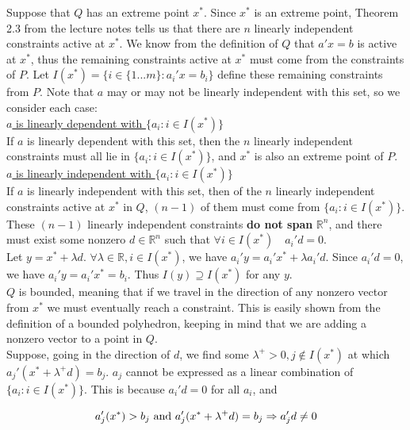 \documentclass[11pt]{article}
\begin{document}
Suppose that $Q$ has an extreme point $x^*$. Since $x^*$ is an extreme point, Theorem 2.3 from the lecture notes tells us that there are $n$ linearly independent constraints active at $x^*$. We know from the definition of $Q$ that $a'x=b$ is active at $x^*$, thus the remaining constraints active at $x^*$ must come from the constraints of $P$. Let $I(x^*)=\{i\in\{1...m\}:a_i'x=b_i\}$ define these remaining constraints from $P$. Note that $a$ may or may not be linearly independent with this set, so we consider each case:\\

\underline{$a$ is linearly dependent with $\{a_i:i\in I(x^*)\}$}\\

If $a$ is linearly dependent with this set, then the $n$ linearly independent constraints must all lie in $\{a_i:i\in I(x^*)\}$, and $x^*$ is also an extreme point of $P$.\\

\underline{$a$ is linearly independent with $\{a_i:i\in I(x^*)\}$}\\

If $a$ is linearly independent with this set, then of the $n$ linearly independent constraints active at $x^*$ in $Q$, $(n-1)$ of them must come from  $\{a_i:i\in I(x^*)\}$. These $(n-1)$ linearly independent constraints \textbf{do not span} $\mathbb{R}^n$, and there must exist some nonzero $d\in\mathbb{R}^n$ such that $\forall i\in I(x^*)\quad a_i'd=0$.\\

Let $y=x^*+\lambda d$. $\forall \lambda\in\mathbb{R}, i\in I(x^*)$, we have $a_i'y=a_i'x^*+\lambda a_i'd$. Since $a_i'd=0$, we have $a_i'y = a_i'x^*=b_i$. Thus $I(y)\supseteq I(x^*)$ for any $y$. \\

$Q$ is bounded, meaning that if we travel in the direction of any nonzero vector from $x^*$ we must eventually reach a constraint. This is easily shown from the definition of a bounded polyhedron, keeping in mind that we are adding a nonzero vector to a point in $Q$.\\

Suppose, going in the direction of $d$, we find some $\lambda^+>0, j\notin I(x^*)$ at which $a_j'(x^*+\lambda^+d)=b_j$. $a_j$ cannot be expressed as a linear combination of $\{a_i: i\in I(x^*)\}$. This is because $a_i'd=0$ for all $a_i$, and

$$
a_j'(x^*)>b_j \text{ and } a_j'(x^* + \lambda^+ d) = b_j \Rightarrow a_j'd \neq 0\\
$$
\end{document}
